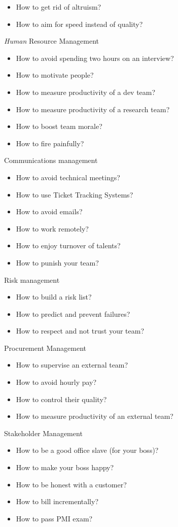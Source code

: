 \documentclass[nobrand,anonymous,nodate,nosecurity]{huawei}
\renewcommand\emph[1]{\textit{#1}}
\begin{document}
{\begin{lectures}
\begin{itemize}
    \item How to get rid of altruism?
    \item How to aim for speed instead of quality?
    \end{itemize}
\item \emph{Human} Resource Management
    \begin{itemize}
    \item How to avoid spending two hours on an interview?
    \item How to motivate people?
    \item How to measure productivity of a dev team?
    \item How to measure productivity of a research team?
    \item How to boost team morale?
    \item How to fire painfully?
    \end{itemize}
\item Communications management
    \begin{itemize}
    \item How to avoid technical meetings?
    \item How to use Ticket Tracking Systems?
    \item How to avoid emails?
    \item How to work remotely?
    \item How to enjoy turnover of talents?
    \item How to punish your team?
    \end{itemize}
\item Risk management
    \begin{itemize}
    \item How to build a risk list?
    \item How to predict and prevent failures?
    \item How to respect and not trust your team?
    \end{itemize}
\item Procurement Management
    \begin{itemize}
    \item How to supervise an external team?
    \item How to avoid hourly pay?
    \item How to control their quality?
    \item How to measure productivity of an external team?
    \end{itemize}
\item Stakeholder Management
    \begin{itemize}
    \item How to be a good office slave (for your boss)?
    \item How to make your boss happy?
    \item How to be honest with a customer?
    \item How to bill incrementally?
    \item How to pass PMI exam?
    \end{itemize}
\end{lectures}

}
\end{document}
